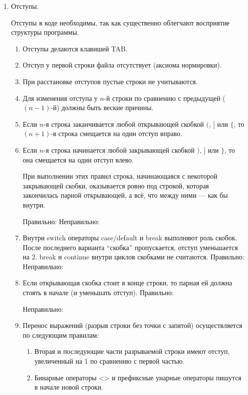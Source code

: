 \begin{enumerate}
	\item
		Отступы.

		Отступы в коде необходимы, так как существенно облегчают восприятие структуры программы.
		\begin{enumerate}
			\item
				Отступы делаются клавишей TAB.
			\item
				Отступ у первой строки файла отсутствует (аксиома нормировки).
			\item
				При расстановке отступов пустые строки не учитываются.
			\item
				Для изменения отступа у $n$-й строки по сравнению с предыдущей ($(n-1)$-й) должны быть веские причины.
			\item
				Если $n$-я строка заканчивается любой открывающей скобкой $($, $[$ или $\{$,
				то $(n+1)$-я строка смещается на один отступ вправо.
			\item
				Если $n$-я строка начинается любой закрывающей скобкой $)$, $]$ или $\}$,
				то она смещается на один отступ влево.

				При выполнении этих правил строка, начинающаяся с некоторой закрывающей скобки, оказывается ровно под строкой,
				которая закончилась парной открывающей, а всё, что между ними --- как бы внутри.

				Правильно:
				Неправильно:


			\item
				Внутри switch операторы case/default и break выполняют роль скобок.
				После последнего варианта ``скобка'' пропускается, отступ уменьшается на 2.
				break и continue внутри циклов скобками не считаются.
				Правильно:
				Неправильно:


			\item
				Если открывающая скобка стоит в конце строки, то парная ей должна стоять в начале (и уменьшать отступ).
				Правильно:

				Неправильно:

			\item
				Перенос выражений (разрыв строки без точки с запятой) осуществляется по следующим правилам:
				\begin{enumerate}
					\item
						Вторая и последующие части разрываемой строки имеют отступ, увеличенный на 1 по сравнению с первой частью.
					\item
						Бинарные операторы  <\!< и >\!> и префиксные унарные операторы пишутся в начале новой строки.


\end{enumerate}
\end{enumerate}
\end{enumerate}
